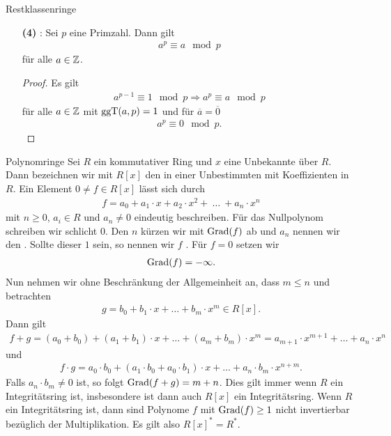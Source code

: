 \begin{genericdf}{Restklassenringe}
\begin{enumerate}
		\item[\textbf{(4)}]
		:
		Sei $p$ eine Primzahl. Dann gilt
		\begin{align*}
		a^p \equiv a \mod p
		\end{align*}
		für alle $a \in \mathbb{Z}$.
		\begin{proof}
			Es gilt
			\begin{align*}
			a^{p-1} \equiv 1 \mod p 
			\Rightarrow
			a^p \equiv a \mod p
			\end{align*}
			für alle $a \in \mathbb{Z}$ mit $\operatorname{ggT}(a,p) = 1$ und für
			$\overline{a} = \overline{0}$
			\begin{align*}
			a^p \equiv 0 \mod p.
			\end{align*}
		\end{proof}
	\end{enumerate}		
		
\end{genericdf}

\begin{genericdf}{Polynomringe}\label{skript:7.7}
	Sei $R$ ein kommutativer Ring und $x$ eine Unbekannte über $R$.
	Dann bezeichnen wir mit $R[x]$ den  in einer Unbestimmten mit Koeffizienten in $R$.
	Ein Element $0 \neq f \in R[x]$ lässt sich durch
	\begin{align*}
	f = a_0 + a_1 \cdot x + a_2 \cdot x^2 + \ \dots \ + a_n \cdot x^n
	\end{align*}
	mit $n \geq 0 $, $a_i \in R$ und $a_n \neq 0$ eindeutig beschreiben. 
	Für das Nullpolynom schreiben wir schlicht $0 $.
	Den  $n$ kürzen wir mit $\operatorname{Grad}(f)$ ab und $a_n $ nennen wir den .
	Sollte dieser $1$ sein, so nennen wir $f$ .
	Für $f = 0$ setzen wir 
	\begin{align*}
	\operatorname{Grad}(f) = - \infty.
	\end{align*}	 
	Nun nehmen wir ohne Beschränkung der Allgemeinheit an, dass $m \leq n$ und betrachten
	\begin{align*}
	g = b_0 + b_1 \cdot x + \dots + b_m \cdot x^m \in R[x].
	\end{align*}
	Dann gilt
	\begin{align*}
	f+g = (a_0 + b_0) + (a_1 + b_1) \cdot x + \dots + (a_m + b_m) \cdot x^m
		= a_{m+1} \cdot x^{m+1} + \dots + a_n \cdot x^n
	\end{align*}
	und
	\begin{align*}
	f \cdot g = a_0 \cdot b_0 + (a_1 \cdot b_0 + a_0 \cdot b_1 ) \cdot x 
				+ \dots + a_n \cdot b_m \cdot x^{n+m}.
	\end{align*}
	Falls $a_n \cdot b_m \neq 0$ ist, so folgt $\operatorname{Grad}(f+g) = m+n$.
	Dies gilt immer wenn $R$ ein Integritätsring ist, insbesondere ist dann auch $R[x]$ ein Integritätsring.
	Wenn $R$ ein Integritätsring ist, dann sind Polynome $f$ mit $\operatorname{Grad}(f) \geq 1$ nicht invertierbar bezüglich der Multiplikation.
	Es gilt also $R[x]^\ast = R^\ast$.
\end{genericdf}

